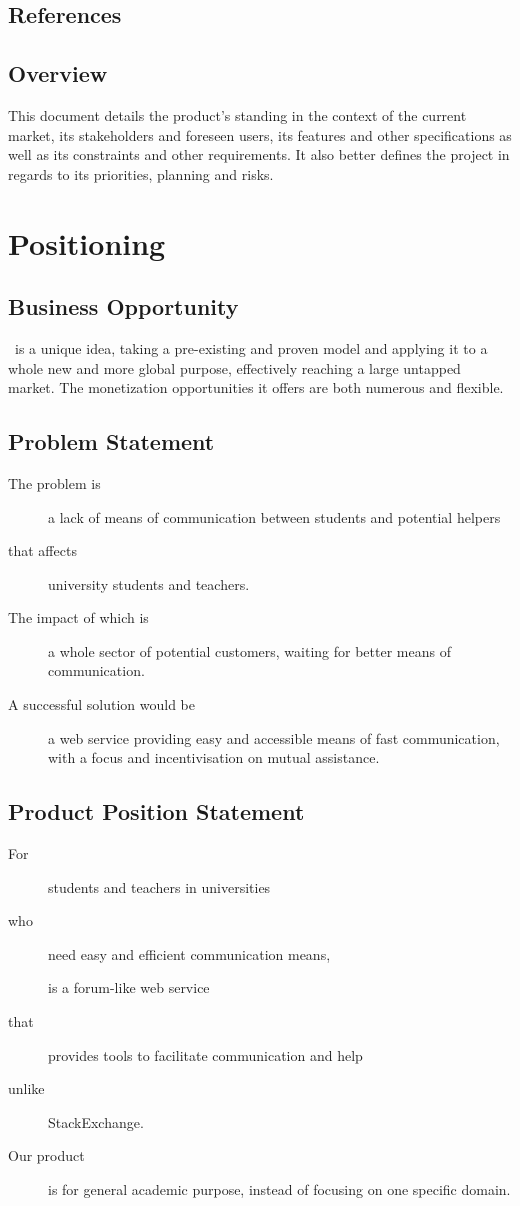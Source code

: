 \documentclass [a4paper, 11pt]{article}
\newcommand \projectname {\mbox{\bsc{Academi-co}}}
\begin{document}
\subsection{References}


\subsection{Overview}
This document details the product's standing in the context of the current market, its stakeholders and foreseen users, its features and other specifications as well as its constraints and other requirements. It also better defines the project in regards to its priorities, planning and risks.



\section{Positioning}
\subsection{Business Opportunity}
\projectname \ is a unique idea, taking a pre-existing and proven model and applying it to a whole new and more global purpose, effectively reaching a large untapped market. The monetization opportunities it offers are both numerous and flexible.

\subsection{Problem Statement}
\begin{description}
	\item [The problem is] a lack of means of communication between students and potential helpers
	\item [that affects] university students and teachers.
	\item [The impact of which is] a whole sector of potential customers, waiting for better means of communication.
	\item [A successful solution would be] a web service providing easy and accessible means of fast communication, with a focus and incentivisation on mutual assistance.
\end{description}

\subsection{Product Position Statement}
\begin{description}
	\item [For] students and teachers in universities
	\item [who] need easy and efficient communication means,
	\item [\projectname] is a forum-like web service
	\item [that] provides tools to facilitate communication and help
	\item [unlike] StackExchange.
	\item [Our product] is for general academic purpose, instead of focusing on one specific domain.
\end{description}
\end{document}
